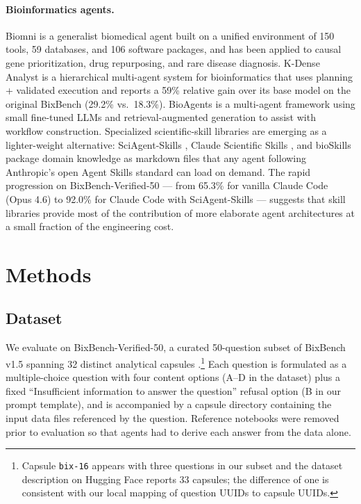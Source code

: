 \documentclass[11pt]{article}
\begin{document}
\paragraph{Bioinformatics agents.}
Biomni \citep{huang2025biomni} is a generalist biomedical agent built on
a unified environment of 150 tools, 59 databases, and 106 software
packages, and has been applied to causal gene prioritization, drug
repurposing, and rare disease diagnosis. K-Dense Analyst
\citep{li2025kdense} is a hierarchical multi-agent system for
bioinformatics that uses planning + validated execution and reports a
59\% relative gain over its base model on the original BixBench (29.2\%
vs.\ 18.3\%). BioAgents \citep{mehandru2025bioagents} is a multi-agent
framework using small fine-tuned LLMs and retrieval-augmented generation
to assist with workflow construction. Specialized scientific-skill
libraries are emerging as a lighter-weight alternative: SciAgent-Skills
\citep{sciagent2026}, Claude Scientific Skills \citep{kdenseskills},
and bioSkills \citep{bioskills} package domain knowledge as markdown
files that any agent following Anthropic's open Agent Skills standard
\citep{anthropicskills} can load on demand. The rapid progression on
BixBench-Verified-50 --- from 65.3\% for vanilla Claude Code (Opus 4.6)
\citep{phylo2026} to 92.0\% for Claude Code with SciAgent-Skills
\citep{sciagent2026} --- suggests that skill libraries provide most of the
contribution of more elaborate agent architectures at a small fraction of
the engineering cost.

\section{Methods}\label{sec:methods}

\subsection{Dataset}
We evaluate on BixBench-Verified-50, a curated 50-question subset of
BixBench v1.5 spanning 32 distinct analytical capsules
\citep{phylo2026}.\footnote{Capsule \texttt{bix-16} appears with three
questions in our subset and the dataset description on Hugging Face
reports 33 capsules; the difference of one is consistent with our local
mapping of question UUIDs to capsule UUIDs.} Each question is
formulated as a multiple-choice question with four content options
(A--D in the dataset) plus a fixed ``Insufficient information to answer
the question'' refusal option (B in our prompt template), and is
accompanied by a capsule directory containing the input data files
referenced by the question. Reference notebooks were removed prior to
evaluation so that agents had to derive each answer from the data alone.
\end{document}
